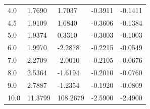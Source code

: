 \begin{table}[h]
\begin{tabular}{ m{6em} m{6em}  m{6em}  m{6em} m{6em} }
        4.0 & 1.7690 & 1.7037 & -0.3911 & -0.1411 \\
        4.5 & 1.9109 & 1.6840 & -0.3606 & -0.1384 \\
        5.0 & 1.9374 & 0.3310 & -0.3003 & -0.1003 \\
        6.0 & 1.9970 & -2.2878 & -0.2215 & -0.0549 \\
        7.0 & 2.2709 & -2.0010 & -0.2105 & -0.0676 \\
        8.0 & 2.5364 & -1.6194 & -0.2010 & -0.0760 \\
        9.0 & 2.7887 & -1.2354 & -0.1920 & -0.0809 \\
        10.0 & 11.3799 & 108.2679 & -2.5900 & -2.4900 \\
		\hline
		\end{tabular}
        \end{table}


